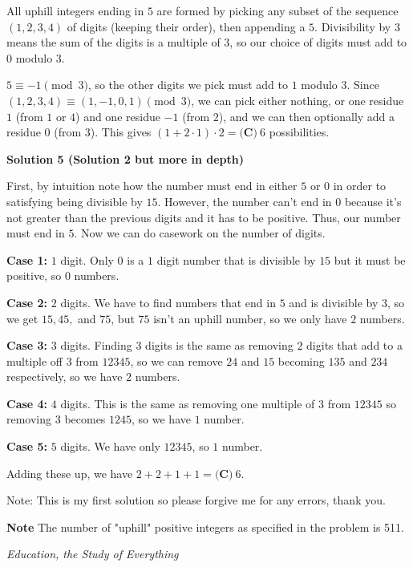 \begin{enumerate}
 All uphill integers ending in $5$ are formed by picking any subset of the sequence $(1,2,3,4)$ of digits (keeping their order), then appending a $5$. Divisibility by $3$ means the sum of the digits is a multiple of $3$, so our choice of digits must add to $0$ modulo $3$.

 $5 \equiv -1 \pmod{3}$, so the other digits we pick must add to $1$ modulo $3$. Since $(1,2,3,4) \equiv (1,-1,0,1) \pmod{3}$, we can pick either nothing, or one residue $1$ (from $1$ or $4$) and one residue $-1$ (from $2$), and we can then optionally add a residue $0$ (from $3$). This gives $(1+2\cdot1)\cdot2 = \boxed{\textbf{(C)}~6}$ possibilities.

 



\textbf{Solution 5 (Solution 2 but more in depth)}

First, by intuition note how the number must end in either $5$ or $0$ in order to satisfying being divisible by $15$. However, the number can't end in $0$ because it's not greater than the previous digits and it has to be positive. Thus, our number must end in $5$. Now we can do casework on the number of digits.

 \textbf{Case 1:} $1$ digit. Only $0$ is a $1$ digit number that is divisible by $15$ but it must be positive, so $0$ numbers.

 \textbf{Case 2:} $2$ digits. We have to find numbers that end in $5$ and is divisible by $3$, so we get $15, 45,$ and $75$, but $75$ isn't an uphill number, so we only have $2$ numbers.

 \textbf{Case 3:} $3$ digits. Finding $3$ digits is the same as removing $2$ digits that add to a multiple off $3$ from $12345$, so we can remove $24$ and $15$ becoming $135$ and $234$ respectively, so we have $2$ numbers.

 \textbf{Case 4:} $4$ digits. This is the same as removing one multiple of $3$ from $12345$ so removing $3$ becomes $1245$, so we have $1$ number.

 \textbf{Case 5:} $5$ digits. We have only $12345$, so $1$ number.

 Adding these up, we have $2+2+1+1=\boxed{\textbf{(C)} ~6}$.

 Note: This is my first solution so please forgive me for any errors, thank you.

 \textbf{Note} The number of "uphill" positive integers as specified in the problem is 511.

 \textit{ Education, the Study of Everything }


\end{enumerate}
